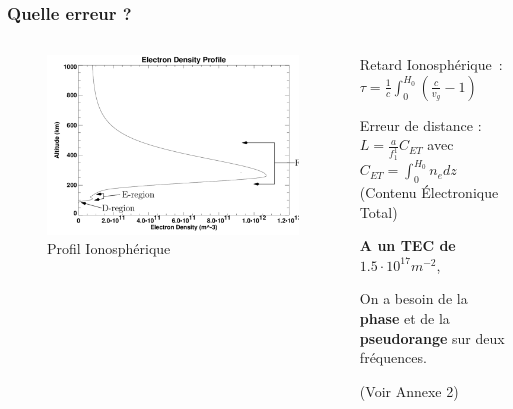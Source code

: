 \documentclass[xcolor=dvipsnames,envcountsect]{beamer}
\begin{document}
\begin{frame}
	\frametitle{Quelle erreur ?}
	\justifying
		\begin{columns}
			\begin{column}{0.5\textwidth}
				\begin{figure}
					\centering
					\includegraphics[width=1\textwidth]{./Figures/iono_profil.png}
					\caption {Profil Ionosphérique \cite{ionoprofil}}
				\end{figure}
			\end{column}
			\begin{column}{0.5\textwidth}

				Retard Ionosphérique : \\
				$\tau = \frac{1}{c} \int_{0}^{H_0} (\frac{c}{v_g}-1)$ \newline

				Erreur de distance : \\
				$L = \frac{a}{f_1^1} C_{ET}$ avec $C_{ET} = \int_{0}^{H_0} n_e dz$ (Contenu Électronique Total)
				\newline

				\begin{center}
					\textbf{A un TEC de }$1.5\cdot 10^{17} m^{-2}$, 
				\end{center}

				On a besoin de la \textbf{phase} et de la \textbf{pseudorange} sur deux fréquences.
				\begin{flushright}
					\tiny{(Voir Annexe 2)}
				\end{flushright}
			\end{column}
		\end{columns}
\end{frame}
\end{document}
